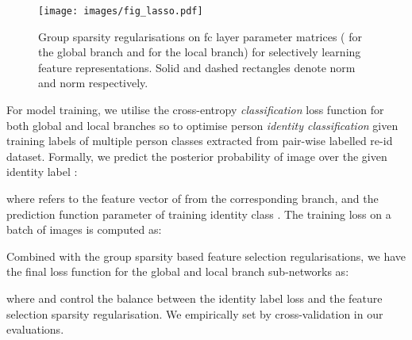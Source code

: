 \documentclass{article}
\begin{document}
\begin{figure} [h!]
	\centering
	\texttt{[image: images/fig\_lasso.pdf]}
	\vskip -0.3cm
	\caption{\footnotesize
		Group sparsity regularisations on fc layer parameter matrices
		( for the global branch and 
		 for the local branch)
		for selectively learning feature representations.
Solid and dashed rectangles denote  norm and
		 norm respectively. 
}
	\label{fig:lasso}
\end{figure}

\vspace{0.1cm}
For model training,
we utilise the cross-entropy {\em classification} loss function
for both global and local branches so to optimise person {\em identity
classification} given training labels of multiple person classes
extracted from pair-wise labelled re-id dataset.
Formally, 
we predict the posterior probability  of image 
over the given identity label :

where  refers to the feature vector of  from the corresponding branch,
and  the prediction function parameter
of training identity class .
The training loss on a batch of  images is computed as:

Combined with the group sparsity based feature selection regularisations, 
we have the final loss function for the global and local branch
sub-networks as: 

where  and 
control the balance between the identity label loss and the feature
selection sparsity regularisation. 
We empirically set 
by cross-validation in our evaluations. 
\end{document}
